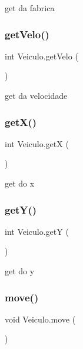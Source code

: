 get da fabrica 

\mbox{\label{class_veiculo_aed4b192929f7efd2234059f139bb29df}} 
\subsubsection{\texorpdfstring{get\+Velo()}{getVelo()}}
{\footnotesize\ttfamily int Veiculo.\+get\+Velo (\begin{DoxyParamCaption}{ }\end{DoxyParamCaption})}



get da velocidade 

\mbox{\label{class_veiculo_a235b29e1e25ec8c769b20fb2aeba8404}} 
\subsubsection{\texorpdfstring{get\+X()}{getX()}}
{\footnotesize\ttfamily int Veiculo.\+getX (\begin{DoxyParamCaption}{ }\end{DoxyParamCaption})}



get do x 

\mbox{\label{class_veiculo_a06b2a923e51186673a016f75d10363d3}} 
\subsubsection{\texorpdfstring{get\+Y()}{getY()}}
{\footnotesize\ttfamily int Veiculo.\+getY (\begin{DoxyParamCaption}{ }\end{DoxyParamCaption})}



get do y 

\mbox{\label{class_veiculo_a3341b0ed6b4d34db990a31f7a499ae80}} 
\subsubsection{\texorpdfstring{move()}{move()}}
{\footnotesize\ttfamily void Veiculo.\+move (\begin{DoxyParamCaption}{ }\end{DoxyParamCaption})}


